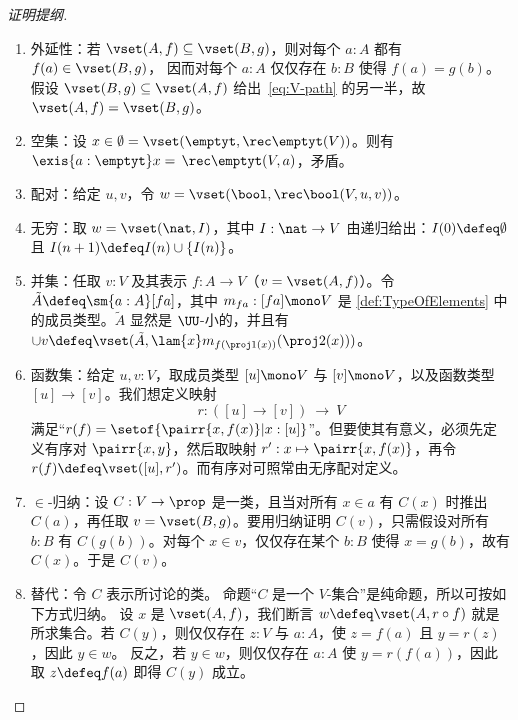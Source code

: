 \begin{proof}[证明提纲]
  \mbox{}
  \begin{enumerate}
  \item 外延性：若 $\vset(A,f) \subseteq \vset(B, g)$，则对每个 $a : A$ 都有 $f(a) \in \vset(B, g)$，
    因而对每个 $a : A$ 仅仅存在 $b : B$ 使得
    $f(a) = g(b)$。假设 $\vset(B, g) \subseteq \vset(A, f)$ 给出~\eqref{eq:V-path}
    的另一半，故 $\vset(A,f) = \vset(B,g)$。

  \item 空集：设 $x\in \emptyset = \vset(\emptyt,\rec\emptyt(V))$。则有 $\exis{a:\emptyt}x=\, \rec\emptyt(V,a)$，矛盾。

  \item 配对：给定 $u,v$，令 $w=\vset(\bool,\rec\bool(V,u,v))$。

  \item 无穷：取 $w = \vset(\nat,I)$，其中 $I: \nat \to V$ 由递归给出：$I(0) \defeq \emptyset$ 且 $I(n+1) \defeq I(n)\cup \{I(n)\}$。

  \item 并集：任取 $v:V$ 及其表示 $f :A\to V$（$v=\vset(A,f)$）。令 $\tilde{A} \defeq \sm{a:A}[fa]$，其中 $m_{fa} : [fa] \mono V$ 是 \cref{def:TypeOfElements} 中的成员类型。$\tilde{A}$ 显然是 $\UU$-小的，并且有 $\cup v \defeq \vset(\tilde{A}, \lam{x} m_{f(\proj1(x))}(\proj2(x)))$。

  \item 函数集：给定 $u,v:V$，取成员类型 $[u] \mono V$ 与 $[v] \mono V$，以及函数类型 $[u]\to [v]$。我们想定义映射
  \[
 r: ([u]\to [v])\ \longrightarrow\ V
  \]
   满足“$r(f) = \setof{ \pairr{x, f(x)} | x : [u] }$”。但要使其有意义，必须先定义有序对 $\pairr{x, y}$，然后取映射 $r': x \mapsto \pairr{x, f(x)}$，再令 $r(f)\defeq \vset([u], r')$。而有序对可照常由无序配对定义。

  \item $\in$-归纳：设 $C : V \to \prop$ 是一类，且当对所有 $x\in a$ 有 $C(x)$ 时推出 $C(a)$，再任取 $v=\vset(B,g)$。要用归纳证明 $C(v)$，只需假设对所有 $b:B$ 有 $C(g(b))$。对每个 $x\in v$，仅仅存在某个 $b:B$ 使得 $x = g(b)$，故有 $C(x)$。于是 $C(v)$。

  \item 替代：令 $C$ 表示所讨论的类。
    命题“$C$ 是一个 $V$-集合”是纯命题，所以可按如下方式归纳。
    设 $x$ 是 $\vset(A, f)$，我们断言 $w
    \defeq \vset(A, r \circ f)$ 就是所求集合。若 $C(y)$，则仅仅存在
    $z : V$ 与 $a : A$，使 $z = f(a)$ 且 $y = r(z)$，因此 $y \in w$。
    反之，若 $y \in w$，则仅仅存在 $a : A$ 使 $y = r(f(a))$，因此
    取 $z \defeq f(a)$ 即得 $C(y)$ 成立。


\end{enumerate}
\end{proof}
